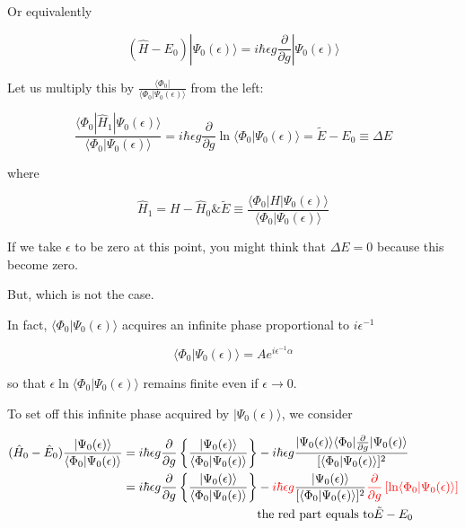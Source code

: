 Or equivalently

\[(\hat{H}-E_0)|\Psi_0(\epsilon)\rangle = i\hbar\epsilon g\frac{\partial}{\partial g}|\Psi_0(\epsilon)\rangle \]

Let us multiply this by $\displaystyle\frac{\langle\Phi_0|}{\langle\Phi_0|\Psi_0(\epsilon)\rangle}$ from the left: 

\[\frac{\langle\Phi_0|\hat{H}_1|\Psi_0(\epsilon)\rangle}{\langle\Phi_0|\Psi_0(\epsilon)\rangle} = i\hbar\epsilon g\frac{\partial}{\partial g}\ln\langle\Phi_0|\Psi_0(\epsilon)\rangle = \tilde{E}-E_0\equiv\Delta E \]

where

\[\hat{H}_1 = H-\hat{H}_0 \& \tilde{E} \equiv\frac{\langle\Phi_0|H|\Psi_0(\epsilon)\rangle}{\langle\Phi_0|\Psi_0(\epsilon)\rangle} \]

If we take $\epsilon$ to be zero at this point, you might think that $\Delta E=0$ because this become zero. 

But, which is not the case. 

In fact, $\langle\Phi_0|\Psi_0(\epsilon)\rangle$ acquires an infinite phase proportional to $i\epsilon^{-1}$

\[\langle\Phi_0|\Psi_0(\epsilon)\rangle = A e^{i\epsilon^{-1}\alpha} \]

so that $\epsilon \ln \langle\Phi_0|\Psi_0(\epsilon)\rangle$ remains finite even if $\epsilon\to0$. 

To set off this infinite phase acquired by $|\Psi_0(\epsilon)\rangle$, we consider

\[
\begin{split}
(\hat{H}_0-\hat{E}_0)\frac{|\Psi_0(\epsilon)\rangle}{\langle\Phi_0|\Psi_0(\epsilon)\rangle} &= i\hbar\epsilon g\frac{\partial}{\partial g}\left\{\frac{|\Psi_0(\epsilon)\rangle}{\langle\Phi_0|\Psi_0(\epsilon)\rangle}\right\} - i\hbar\epsilon g\frac{|\Psi_0(\epsilon)\rangle\langle\Phi_0|\frac{\partial}{\partial g}|\Psi_0(\epsilon)\rangle}{[\langle\Phi_0|\Psi_0(\epsilon)\rangle]^2}\\
&=i\hbar\epsilon g\frac{\partial}{\partial g}\left\{\frac{|\Psi_0(\epsilon)\rangle}{\langle\Phi_0|\Psi_0(\epsilon)\rangle}\right\} - {{\color{red}{i\hbar\epsilon g}}}\frac{|\Psi_0(\epsilon)\rangle}{[\langle\Phi_0|\Psi_0(\epsilon)\rangle]^2}{{\color{red}{\frac{\partial}{\partial g}\left[\text{ln} \langle\Phi_0|\Psi_0(\epsilon)\rangle\right]}}}\\
&\quad\quad\quad\quad\quad\quad\quad\quad\quad\quad\quad{\text{the red part equals to}} \tilde{E}-E_0
\end{split}
\]

